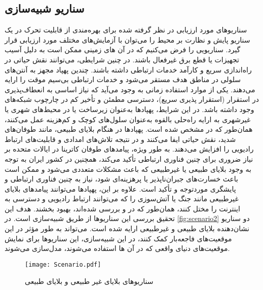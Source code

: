 \subsection{سناریو شبیه‌سازی}
سناریوهای مورد ارزیابی در نظر گرفته شده برای بهره‌مندی از قابلیت تحرک در یک سناریو پایش و نظارت بر محیط را می‌توان با آزمایش‌های مختلف مورد ارزیابی قرار گیرد. سناریویی را فرض می‌کنیم که در آن های زمینی ممکن است به دلیل آسیب تجهیزات یا قطع برق غیرفعال باشند. در چنین شرایطی،  می‌توانند نقش حیاتی در راه‌اندازی سریع و کارآمد خدمات ارتباطی داشته باشند. چندین پهپاد مجهز به آنتن‌های سلولی در مناطق هدف مستقر می‌شود و خدمات ارتباطی بی‌سیم موقت را ارایه می‌دهند. یکی از موارد استفاده زمانی به وجود می‌آید که نیاز اساسی به انعطاف‌پذیری در استقرار (استقرار پذیری سریع)، دسترسی مطمئن و تأخیر کم در چارچوب شبکه‌های  وجود داشته باشد. در این شرایط، پهپادها به‌عنوان زیرساخت  یا  در محیط‌های شهری یا غیرشهری به ارایه راه‌حلی بالقوه به‌عنوان سلول‌های کوچک و کم‌هزینه عمل می‌کنند، همان‌طور که در \cite{Bajracharya2022} مشخص شده است. پهپادها در هنگام بلایای طبیعی، مانند طوفان‌های شدید، نقش حیاتی ایفا می‌کنند و در نتیجه تلاش‌های امدادی و قابلیت‌های ارتباط رادیویی را افزایش می‌دهند. به طور ویژه، پیامدهای طوفان کاترینا در ایالات متحده بر نیاز ضروری برای چنین فناوری ارتباطی تأکید می‌کند، همچنین در کشور ایران به توجه به وجود بلایای طبیعی یا غیرطبیعی که باعث مشکلات متعددی می‌شود و ممکن است باعث خسارت‌های جبران‌ناپذیر یا پرهزینه‌ای شود، نیاز به چنین فناوری ارتباطی و پایشگری موردتوجه و تأکید است. علاوه بر این، پهپادها می‌توانند پیامدهای بلایای غیرطبیعی مانند جنگ یا آتش‌سوزی را که می‌توانند ارتباط رادیویی و دسترسی به اینترنت را مختل کنند، همان‌طور که در \cite{Parvaresh2023} و \cite{Liao2022} بررسی شده‌اند، بهبود بخشند. هدف این تحقیق بررسی این سناریوها از طریق شبیه‌سازی است. در \autoref{fig:scenario2} دو سناریو نشان‌دهنده بلایای طبیعی و غیرطبیعی ارایه شده است.  می‌تواند به طور مؤثر در این موقعیت‌های فاجعه‌بار کمک کنند، در این شبیه‌سازی، این سناریوها برای نمایش موقعیت‌های دنیای واقعی که در آن ها استفاده می‌شوند، مدل‌سازی می‌شوند.
\begin{figure}
\texttt{[image: Scenario.pdf]}
\caption[%
سناریوهای بلایای غیر طبیعی و بلایای طبیعی]{سناریوهای بلایای غیر طبیعی و بلایای طبیعی}
	\label{fig:scenario2}
\end{figure}
